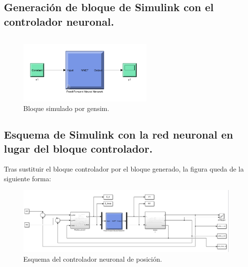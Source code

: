 \documentclass[a4paper, 12pt]{article}
\begin{document}
	\newpage
	\subsection{Generación de bloque de Simulink con el controlador neuronal.}
		\inputminted[fontsize=\scriptsize, linenos, breaklines=true, xleftmargin=0.75cm, frame=lines]{matlab}{code/parte2/EjerG.m}
		
		\begin{figure}[htp!]
			\centering
			\includegraphics[width=0.6\textwidth]{figures/parte2/ejerG.png}
			\caption{Bloque simulado por gensim.}
		\end{figure}
	
	\subsection{Esquema de Simulink con la red neuronal en lugar del bloque controlador.}
	Tras sustituir el bloque controlador por el bloque generado, la figura queda de la siguiente forma:
	\begin{figure}[htp!]
		\centering
		\includegraphics[width=1\textwidth]{figures/parte2/ejerH.png}
		\caption{Esquema del controlador neuronal de posición.}
	\end{figure}
	
	\newpage
\end{document}
